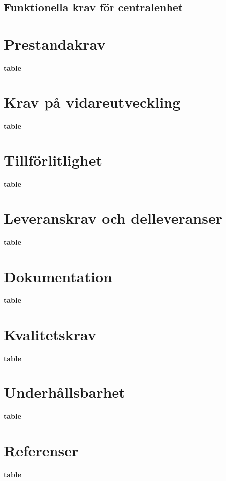 \documentclass[a4paper,titlepage,12pt]{article}
\begin{document}
	\subsection{Funktionella krav för centralenhet}


	\section{Prestandakrav}
	\textbf{table}
	\section{Krav på vidareutveckling}
	\textbf{table}
	\section{Tillförlitlighet}
	\textbf{table}
	\section{Leveranskrav och  delleveranser}
	\textbf{table}
	\section{Dokumentation}
	\textbf{table}
	\section{Kvalitetskrav}
	\textbf{table}
	\section{Underhållsbarhet}
	\textbf{table}
	\section{Referenser}
	\textbf{table}
\end{document}
